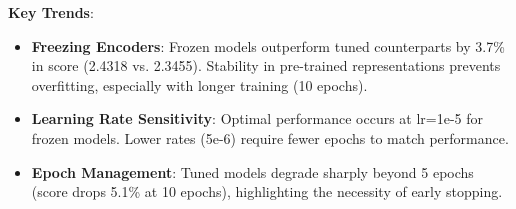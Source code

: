 \begin{table}[h]
    \centering
    \caption{Impact of learning rate, epoch count, optimizer, and freezing on text-only performance. The best configuration is in bold.}
    \label{tab:text-hparam-breakdown}
\end{table}


\noindent \textbf{Key Trends}:
\begin{itemize}
    \item \textbf{Freezing Encoders}: Frozen models outperform tuned counterparts by 3.7\% in score (2.4318 vs. 2.3455). Stability in pre-trained representations prevents overfitting, especially with longer training (10 epochs).
    \item \textbf{Learning Rate Sensitivity}: Optimal performance occurs at lr=1e-5 for frozen models. Lower rates (5e-6) require fewer epochs to match performance.
    \item \textbf{Epoch Management}: Tuned models degrade sharply beyond 5 epochs (score drops 5.1\% at 10 epochs), highlighting the necessity of early stopping.
\end{itemize}

